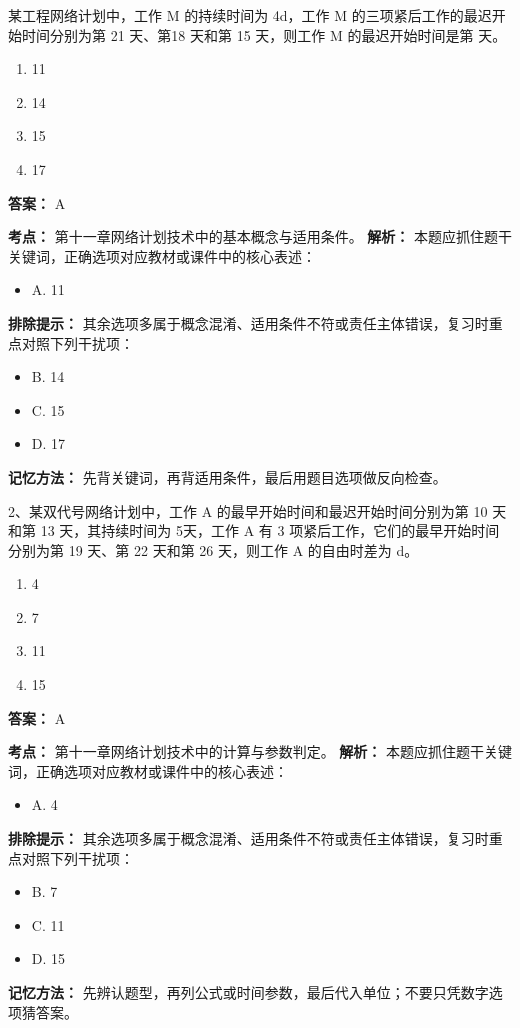 \documentclass[UTF8,fontset=fandol,11pt]{ctexart}
\begin{document}
\begin{quizbox}[title={第 7 题}]
某工程网络计划中，工作 M 的持续时间为 4d，工作 M 的三项紧后工作的最迟开始时间分别为第 21 天、第18 天和第 15 天，则工作 M 的最迟开始时间是第 天。\\
\begin{enumerate}[label=\Alph*.]
\item 11
\item 14
\item 15
\item 17
\end{enumerate}
\textbf{答案：} A
\vspace{0.25em}
\begin{answerbox}[title={考点解析}]
\textbf{考点：} 第十一章网络计划技术中的基本概念与适用条件。
\textbf{解析：} 本题应抓住题干关键词，正确选项对应教材或课件中的核心表述：
\begin{itemize}
\item A. 11
\end{itemize}
\textbf{排除提示：} 其余选项多属于概念混淆、适用条件不符或责任主体错误，复习时重点对照下列干扰项：
\begin{itemize}
\item B. 14
\item C. 15
\item D. 17
\end{itemize}
\textbf{记忆方法：} 先背关键词，再背适用条件，最后用题目选项做反向检查。
\end{answerbox}
\end{quizbox}

\begin{quizbox}[title={第 8 题}]
2、某双代号网络计划中，工作 A 的最早开始时间和最迟开始时间分别为第 10 天和第 13 天，其持续时间为 5天，工作 A 有 3 项紧后工作，它们的最早开始时间分别为第 19 天、第 22 天和第 26 天，则工作 A 的自由时差为 d。\\
\begin{enumerate}[label=\Alph*.]
\item 4
\item 7
\item 11
\item 15
\end{enumerate}
\textbf{答案：} A
\vspace{0.25em}
\begin{answerbox}[title={考点解析}]
\textbf{考点：} 第十一章网络计划技术中的计算与参数判定。
\textbf{解析：} 本题应抓住题干关键词，正确选项对应教材或课件中的核心表述：
\begin{itemize}
\item A. 4
\end{itemize}
\textbf{排除提示：} 其余选项多属于概念混淆、适用条件不符或责任主体错误，复习时重点对照下列干扰项：
\begin{itemize}
\item B. 7
\item C. 11
\item D. 15
\end{itemize}
\textbf{记忆方法：} 先辨认题型，再列公式或时间参数，最后代入单位；不要只凭数字选项猜答案。
\end{answerbox}
\end{quizbox}
\end{document}
